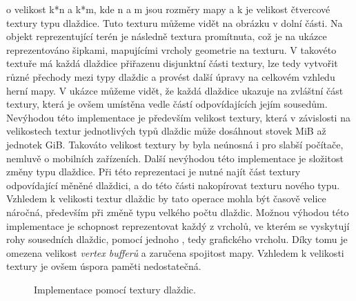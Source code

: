o velikost k*n a k*m, kde n a m jsou rozměry mapy a k je velikost čtvercové textury typu dlaždice. Tuto texturu můžeme vidět na obrázku v dolní části. Na objekt reprezentující terén je následně textura promítnuta, což je na ukázce reprezentováno šipkami, mapujícími vrcholy geometrie na texturu. V takovéto textuře má každá dlaždice přiřazenu disjunktní části textury, lze tedy vytvořit různé přechody mezi typy dlaždic a provést další úpravy na celkovém vzhledu herní mapy. V ukázce můžeme vidět, že každá dlaždice ukazuje na zvláštní část textury, která je ovšem umístěna vedle částí odpovídajících jejím sousedům. Nevýhodou této implementace je především velikost textury, která v závislosti na velikostech textur jednotlivých typů dlaždic může dosáhnout stovek MiB až jednotek GiB. Takováto velikost textury by byla neúnosná i pro slabší počítače, nemluvě o mobilních zařízeních. Další nevýhodou této implementace je složitost změny typu dlaždice. Při této reprezentaci je nutné najít část textury odpovídající měněné dlaždici, a do této části nakopírovat texturu nového typu. Vzhledem k velikosti textur dlaždic by tato operace mohla být časově velice náročná, především při změně typu velkého počtu dlaždic. Možnou výhodou této implementace je schopnost reprezentovat každý z vrcholů, ve kterém se vyskytují rohy sousedních dlaždic, pomocí jednoho , tedy grafického vrcholu. Díky tomu je omezena velikost \textit{vertex bufferů} a zaručena spojitost mapy. Vzhledem k velikosti textury je ovšem úspora paměti nedostatečná.

\begin{figure}[h]
	\centering
	
	\caption{Implementace pomocí textury dlaždic.}
	\label{fig:mapbigtexture}
\end{figure}

